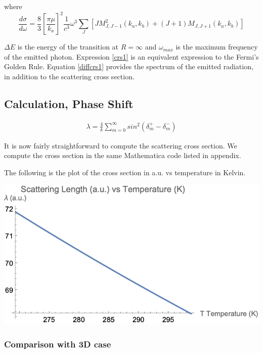 where
\begin{equation}\label{diffcrs1}
\frac{d\sigma}{d\omega} = \frac{8}{3}\left[\frac{\pi \mu}{k_a}\right]^2 \frac{1}{c^3}\omega^3 \sum_{J}{\left[J M_{J,J-1}^2(k_a,k_b) + (J+1)M_{J,J+1}(k_a,k_b)\right] }
\end{equation}

$ \Delta E $ is the energy of the transition at $ R = \infty $ and $ \omega_{max} $ is the maximum frequency of the emitted photon. Expression \eqref{crs1} is an equivalent expression to the Fermi's Golden Rule. Equation \eqref{diffcrs1} provides the spectrum of the emitted radiation, in addition to the scattering cross section. 

\subsection{Calculation, Phase Shift}

\begin{equation}
\begin{split}
  \lambda = \frac{4}{k}\sum_{m=0}^{\infty}{sin^2(\delta_m^{+}-\delta_m^{-})}
\end{split}
\end{equation}

It is now fairly straightforward to compute the scattering cross section. We compute the cross section in the same Mathematica code listed in appendix.


The following is the plot of the cross section in a.u. vs temperature in Kelvin.

\includegraphics{CrossSection1.png}


\subsubsection{Comparison with 3D case}


